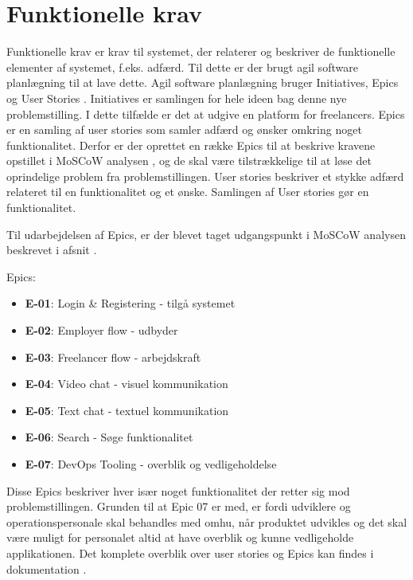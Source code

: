 \section{Funktionelle krav}

Funktionelle krav er krav til systemet, der relaterer og beskriver de funktionelle elementer af systemet, f.eks. adfærd. Til dette er der brugt agil software planlægning \cite[Agil]{converge-terms} til at lave dette. Agil software planlægning bruger Initiatives, Epics og User Stories \cite{atlassian}. Initiatives er samlingen for hele ideen bag denne nye problemstilling. I dette tilfælde er det at udgive en platform for freelancers. Epics er en samling af user stories som samler adfærd og ønsker omkring noget funktionalitet. Derfor er der oprettet en række Epics til at beskrive kravene opstillet i MoSCoW analysen \cite[MoSCoW]{converge-terms}, og de skal være tilstrækkelige til at løse det oprindelige problem fra problemstillingen. User stories beskriver et stykke adfærd relateret til en funktionalitet og et ønske. Samlingen af User stories gør en funktionalitet.

Til udarbejdelsen af Epics, er der blevet taget udgangspunkt i MoSCoW analysen beskrevet i afsnit \cite[Overordnede krav]{documentation-kravspec}.

Epics:

\begin{itemize}
  \item \textbf{E-01}: Login \& Registering - tilgå systemet
  \item \textbf{E-02}: Employer flow - udbyder
  \item \textbf{E-03}: Freelancer flow - arbejdskraft
  \item \textbf{E-04}: Video chat - visuel kommunikation
  \item \textbf{E-05}: Text chat - textuel kommunikation
  \item \textbf{E-06}: Search - Søge funktionalitet
  \item \textbf{E-07}: DevOps Tooling - overblik og vedligeholdelse 
\end{itemize}

Disse Epics beskriver hver især noget funktionalitet der retter sig mod problemstillingen. Grunden til at Epic 07 er med, er fordi udviklere og operationspersonale \cite[Operationspersonale]{converge-terms} skal behandles med omhu, når produktet udvikles og det skal være muligt for personalet altid at have overblik og kunne vedligeholde applikationen. Det komplete overblik over user stories og Epics kan findes i dokumentation \cite[Funktionelle krav]{documentation-kravspec}.
